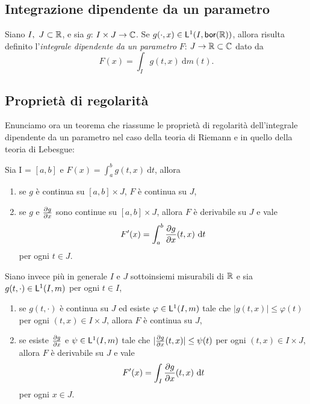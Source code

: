 \documentclass[Completo.tex]{subfiles}
\begin{document}
	\subsection{Integrazione dipendente da un parametro}
	Siano $I, \ J \sset \bb[R]$, e sia $g$: $I \times J \ra \bb[C]$. Se $g(\cdot, x) \in \sf[L]^1(I, \sf[bor](\bb[R]))$, allora risulta definito l'\textit{integrale dipendente da un parametro} $F$: $J \ra \bb[R] \sset \bb[C]$ dato da
	\begin{equation*}
	F(x) = \int_I g(t,x) \ \mathrm{d}m(t).
	\end{equation*}
	\subsection{Proprietà di regolarità}
	Enunciamo ora un teorema che riassume le proprietà di regolarità dell'integrale dipendente da un parametro nel caso della teoria di Riemann e in quello della teoria di Lebesgue:
	\begin{eTh}
		Sia I = $[a,b]$ e $F(x) = \int_{a}^{b} g(t,x) \ \mathrm{d}t$, allora
		\begin{enumerate}
			\item se $g$ è continua su $[a,b] \times J$, $F$ è continua su $J$,
			\item se $g$ e $\frac{\partial g}{\partial x}$ sono continue su $[a,b] \times J$, allora $F$ è derivabile su $J$ e vale
			\begin{equation*}
			F'(x) = \int_{a}^{b} \frac{\partial g}{\partial x}(t,x) \ \mathrm{d}t
			\end{equation*}
			per ogni $t \in J$.
		\end{enumerate}
		Siano invece più in generale $I$ e $J$ sottoinsiemi misurabili di $\bb[R]$ e sia $g(t, \cdot) \in \sf[L]^{1}(I, m)$ per ogni $t \in I$,
		\begin{enumerate}
			\item se $g(t, \cdot)$ è continua su $J$ ed esiste $\varphi \in \sf[L]^1(I, m)$ tale che $\vert g(t,x) \vert \leq \varphi(t)$ per ogni $(t,x) \in I \times J$, allora $F$ è continua su $J$,
			\item se esiste $\frac{\partial g}{\partial x}$ e $\psi \in \sf[L]^1(I, m)$ tale che $\vert \frac{\partial g}{\partial x}(t,x) \vert \leq \psi(t)$ per ogni $(t,x) \in I \times J$, allora $F$ è derivabile su $J$ e vale
			\begin{equation*}
			F'(x) = \int_I \frac{\partial g}{\partial x}(t,x) \ \mathrm{d}t
			\end{equation*}
			per ogni $x \in J$.
		\end{enumerate}
	\end{eTh}
\end{document}
